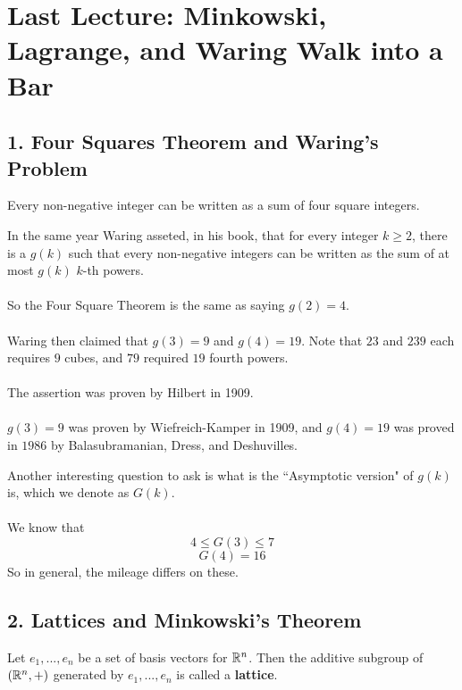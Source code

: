 \section{Last Lecture: Minkowski, Lagrange, and Waring Walk into a Bar}

\subsection{1. Four Squares Theorem and Waring's Problem}

\begin{theorem}[Lagrange, 1770]
Every non-negative integer can be written as a sum of four square integers.
\end{theorem}

\begin{remark}
In the same year Waring asseted, in his book, that for every integer $k \geq 2$, there is a $g(k)$ such that every non-negative integers can be written as the sum of at most $g(k)$ $k$-th powers.\\\\
So the Four Square Theorem is the same as saying $g(2) = 4$.\\\\
Waring then claimed that $g(3) = 9$ and $g(4) = 19$. Note that $23$ and $239$ each requires $9$ cubes, and $79$ required $19$ fourth powers.\\\\
The assertion was proven by Hilbert in 1909.\\\\
$g(3) = 9$ was proven by Wiefreich-Kamper in 1909, and $g(4) = 19$ was proved in $1986$ by Balasubramanian, Dress, and Deshuvilles.
\end{remark}

\begin{remark}
Another interesting question to ask is what is the ``Asymptotic version" of $g(k)$ is, which we denote as $G(k)$.\\\\
We know that
\[4 \leq G(3) \leq 7\]
\[G(4) = 16\]
So in general, the mileage differs on these.
\end{remark}

\subsection{2. Lattices and Minkowski's Theorem}

\begin{definition}
Let $e_1, ..., e_n$ be a set of basis vectors for $\mathbb{R}^n$. Then the additive subgroup of $(\mathbb{R}^n, +)$ generated by $e_1, ..., e_n$ is called a \textbf{lattice}.
\end{definition}

